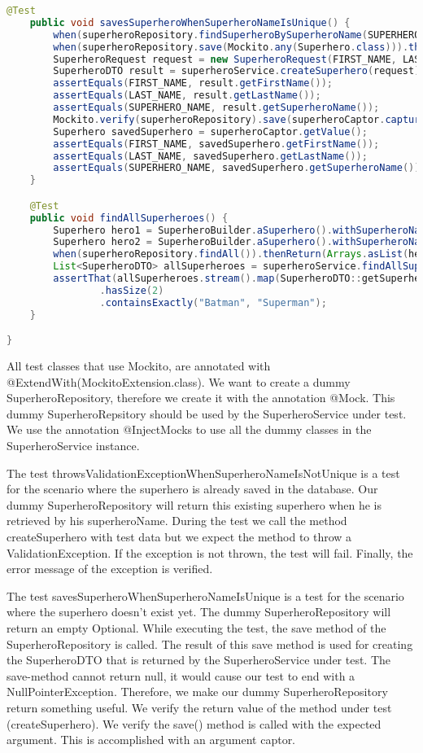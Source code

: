 \begin{lstlisting}[frame=single, language=java]
	@Test
	public void savesSuperheroWhenSuperheroNameIsUnique() {
		when(superheroRepository.findSuperheroBySuperheroName(SUPERHERO_NAME)).thenReturn(Optional.empty());
		when(superheroRepository.save(Mockito.any(Superhero.class))).thenAnswer(AdditionalAnswers.returnsFirstArg());
		SuperheroRequest request = new SuperheroRequest(FIRST_NAME, LAST_NAME, SUPERHERO_NAME);
		SuperheroDTO result = superheroService.createSuperhero(request);
		assertEquals(FIRST_NAME, result.getFirstName());
		assertEquals(LAST_NAME, result.getLastName());
		assertEquals(SUPERHERO_NAME, result.getSuperheroName());
		Mockito.verify(superheroRepository).save(superheroCaptor.capture());
		Superhero savedSuperhero = superheroCaptor.getValue();
		assertEquals(FIRST_NAME, savedSuperhero.getFirstName());
		assertEquals(LAST_NAME, savedSuperhero.getLastName());
		assertEquals(SUPERHERO_NAME, savedSuperhero.getSuperheroName());
	}

	@Test
	public void findAllSuperheroes() {
		Superhero hero1 = SuperheroBuilder.aSuperhero().withSuperheroName("Batman").build();
		Superhero hero2 = SuperheroBuilder.aSuperhero().withSuperheroName("Superman").build();
		when(superheroRepository.findAll()).thenReturn(Arrays.asList(hero1, hero2));
		List<SuperheroDTO> allSuperheroes = superheroService.findAllSuperheroes();
		assertThat(allSuperheroes.stream().map(SuperheroDTO::getSuperheroName).collect(Collectors.toList()))
				.hasSize(2)
				.containsExactly("Batman", "Superman");
	}

}
\end{lstlisting}

All test classes that use Mockito, are annotated with @ExtendWith(MockitoExtension.class).  We want to create a dummy SuperheroRepository, therefore we create it with the annotation @Mock.
This dummy SuperheroRepsitory should be used by the SuperheroService under test.  We use the annotation @InjectMocks to use all the dummy classes in the SuperheroService instance.

The test throwsValidationExceptionWhenSuperheroNameIsNotUnique is a test for the scenario where the superhero is already saved in the database. Our dummy SuperheroRepository will return this existing superhero when he is retrieved by his superheroName.
During the test we call the method createSuperhero with test data but we expect the method to throw a ValidationException.  If the exception is not thrown, the test will fail. Finally, the error message of the exception is verified.


The test savesSuperheroWhenSuperheroNameIsUnique is a test for the scenario where the superhero doesn't exist yet.
The dummy SuperheroRepository will return an empty Optional.  While executing the test, the save method of the SuperheroRepository is called.  The result of this save method is used for creating the SuperheroDTO that is returned by the SuperheroService under test.
The save-method cannot return null, it would cause our test to end with a NullPointerException. Therefore, we make our dummy SuperheroRepository return something useful. We verify the return value of the method under test (createSuperhero). We verify the save() method is called with the expected argument.  This is accomplished with an argument captor. 

